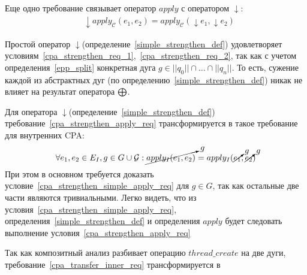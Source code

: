 \begin{itemize}
Еще одно требование связывает оператор $apply$ с оператором $\downarrow$:
\begin{equation}
\label{cpa_strengthen_apply_req}
\begin{aligned}
& \downarrow apply_{\mathscr{C}}(e_1, e_2) = apply_{\mathscr{C}}(\downarrow e_1, \downarrow e_2)
\end{aligned}
\end{equation}


Простой оператор $\downarrow$(определение~\ref{simple_strengthen_def}) удовлетворяет условиям~\ref{cpa_strengthen_req_1},~\ref{cpa_strengthen_req_2}, так как с учетом определения~\ref{epp_split} конкретная дуга $g \in ||q_0|| \cap \dots \cap ||q_n||$.
То есть, сужение каждой из абстрактных дуг (по определению~\ref{simple_strengthen_def}) никак не влияет на результат оператора $\mathrel{\bigoplus}$.

Для оператора $\downarrow$(определение~\ref{simple_strengthen_def}) требование~\ref{cpa_strengthen_apply_req} трансформируется в такое требование для внутренних CPA:
\begin{equation}
\label{cpa_strengthen_simple_apply_req}
\begin{aligned}
\forall e_1, e_2 \in E_I, g \in G \cup \mathcal{G} :
\cancelto{g}{apply_{I}(e_1, e_2)} = apply_I(\cancelto{g}{e_1}, \cancelto{g}{e_2})
\end{aligned}
\end{equation}
При этом в основном требуется доказать условие~\ref{cpa_strengthen_simple_apply_req} для $g \in G$, так как остальные две части являются тривиальными.
Легко видеть, что из условия~\ref{cpa_strengthen_simple_apply_req}, определения~\ref{simple_strengthen_def} и определения $apply$ будет следовать выполнение условия~\ref{cpa_strengthen_apply_req}

Так как композитный анализ разбивает операцию $thread\_create$ на две дуги, требование~\ref{cpa_transfer_inner_req} трансформируется в


\end{itemize}
